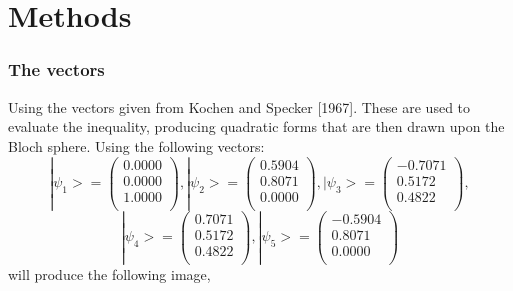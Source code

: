 \documentclass[•]{beamer}
\theoremstyle{remark}
\begin{document}
\section{Methods}
\begin{frame}[shrink=10]\frametitle{The vectors}
\begin{block}

Using the vectors given from Kochen
and Specker [1967]. These are used to evaluate the inequality, producing quadratic forms that are then drawn upon the Bloch sphere.
Using the following vectors: \pause
\begin{equation*}
|\psi_1>=
\begin{pmatrix}
0.0000\\
0.0000\\
1.0000\\
\end{pmatrix}
,
|\psi_2>=
\begin{pmatrix}
0.5904\\
0.8071\\
0.0000\\
\end{pmatrix}
,
|\psi_3>=
\begin{pmatrix}
-0.7071\\
0.5172\\
0.4822\\
\end{pmatrix}
,
\end{equation*}
\begin{equation*}
|\psi_4>=
\begin{pmatrix}
0.7071\\
0.5172\\
0.4822\\
\end{pmatrix}
,
|\psi_5>=
\begin{pmatrix}
-0.5904\\
0.8071\\
0.0000\\
\end{pmatrix}
\end{equation*}
will produce the following image,
\end{block}
\end{frame}
\end{document}
